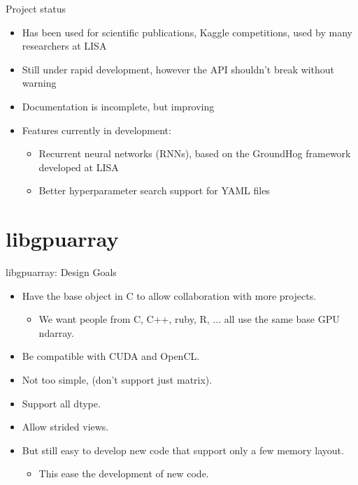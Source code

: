 \documentclass[utf8x,xcolor=pdftex,dvipsnames,table]{beamer}
\begin{document}
\begin{frame}{Project status}
  \begin{itemize}
    \item Has been used for scientific publications, Kaggle competitions, used by many researchers at LISA
    \item Still under rapid development, however the API shouldn't break without warning
    \item Documentation is incomplete, but improving
    \item Features currently in development:
    \begin{itemize}
      \item Recurrent neural networks (RNNs), based on the GroundHog framework developed at LISA
      \item Better hyperparameter search support for YAML files
    \end{itemize}
  \end{itemize}
\end{frame}

\section{libgpuarray}
\begin{frame}{libgpuarray: Design Goals}
  \begin{itemize}
  \item Have the base object in C to allow collaboration with more projects.
    \begin{itemize}
    \item We want people from C, C++, ruby, R, ... all use the same base GPU ndarray.
    \end{itemize}
  \item Be compatible with CUDA and OpenCL.
  \item Not too simple, (don’t support just matrix).
  \item Support all dtype.
  \item Allow strided views.
  \item But still easy to develop new code that support only a few memory layout.
    \begin{itemize}
    \item This ease the development of new code.
    \end{itemize}
  \end{itemize}
\end{frame}
\end{document}

